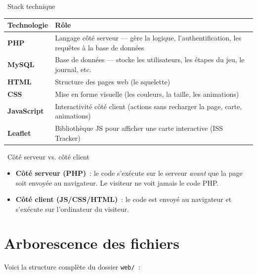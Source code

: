 \documentclass[12pt,a4paper]{article}
\begin{document}
\begin{conceptbox}{\faCode\ Stack technique}
\begin{tabularx}{\textwidth}{lX}
    \toprule
    \textbf{Technologie} & \textbf{Rôle} \\
    \midrule
    \textbf{PHP}        & Langage côté serveur --- gère la logique, l'authentification, les requêtes à la base de données \\
    \textbf{MySQL}      & Base de données --- stocke les utilisateurs, les étapes du jeu, le journal, etc. \\
    \textbf{HTML}       & Structure des pages web (le squelette) \\
    \textbf{CSS}        & Mise en forme visuelle (les couleurs, la taille, les animations) \\
    \textbf{JavaScript} & Interactivité côté client (actions sans recharger la page, carte, animations) \\
    \textbf{Leaflet}    & Bibliothèque JS pour afficher une carte interactive (ISS Tracker) \\
    \bottomrule
\end{tabularx}
\end{conceptbox}

\begin{tipbox}{\faLightbulb\ Côté serveur vs. côté client}
\begin{itemize}
    \item \textbf{Côté serveur (PHP)}~: le code s'exécute sur le serveur \textit{avant} que la page soit envoyée au navigateur. Le visiteur ne voit jamais le code PHP.
    \item \textbf{Côté client (JS/CSS/HTML)}~: le code est envoyé au navigateur et s'exécute sur l'ordinateur du visiteur.
\end{itemize}
\end{tipbox}

\section{Arborescence des fichiers}

Voici la structure complète du dossier \texttt{web/}~:
\end{document}
